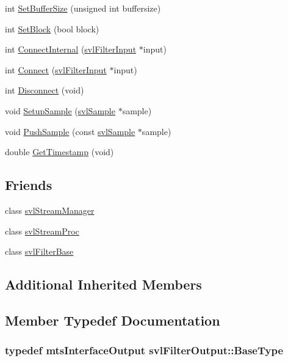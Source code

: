 \begin{DoxyCompactItemize}
\item 
int \hyperlink{classsvl_filter_output_acead42898ed4d883f3e5fa61e4b98e05}{Set\-Buffer\-Size} (unsigned int buffersize)
\item 
int \hyperlink{classsvl_filter_output_a0eb7c5b01a575deca2384483cd503e5e}{Set\-Block} (bool block)
\item 
int \hyperlink{classsvl_filter_output_ab9bf0a164e2d579b50cdb4547b53a6b1}{Connect\-Internal} (\hyperlink{classsvl_filter_input}{svl\-Filter\-Input} $\ast$input)
\item 
int \hyperlink{classsvl_filter_output_a488e5d64ab5b37afbe18b3e8214eb637}{Connect} (\hyperlink{classsvl_filter_input}{svl\-Filter\-Input} $\ast$input)
\item 
int \hyperlink{classsvl_filter_output_a4b18fc71114c7bb8344f9d66b0d63b95}{Disconnect} (void)
\item 
void \hyperlink{classsvl_filter_output_a4e522260ab6e2772ebc8f767897f681a}{Setup\-Sample} (\hyperlink{classsvl_sample}{svl\-Sample} $\ast$sample)
\item 
void \hyperlink{classsvl_filter_output_a4e1baef6ee205cf01fd17b5aa5686849}{Push\-Sample} (const \hyperlink{classsvl_sample}{svl\-Sample} $\ast$sample)
\item 
double \hyperlink{classsvl_filter_output_a20525e4791106e6a9e2d5a9f9a5e982d}{Get\-Timestamp} (void)
\end{DoxyCompactItemize}
\subsection*{Friends}
\begin{DoxyCompactItemize}
\item 
class \hyperlink{classsvl_filter_output_ab5eee58544f2ce644140e932afbe32db}{svl\-Stream\-Manager}
\item 
class \hyperlink{classsvl_filter_output_a6a9ee1dec5ca263793dca09411295245}{svl\-Stream\-Proc}
\item 
class \hyperlink{classsvl_filter_output_aadcba5e897486de2d761520b866f4ac0}{svl\-Filter\-Base}
\end{DoxyCompactItemize}
\subsection*{Additional Inherited Members}


\subsection{Member Typedef Documentation}
\hypertarget{classsvl_filter_output_ac8dd607dba96f25d0ae0c249e293d04f}{
\subsubsection[{Base\-Type}]{\setlength{\rightskip}{0pt plus 5cm}typedef {\bf mts\-Interface\-Output} {\bf svl\-Filter\-Output\-::\-Base\-Type}}}\label{classsvl_filter_output_ac8dd607dba96f25d0ae0c249e293d04f}


